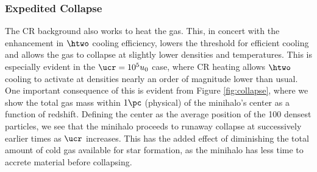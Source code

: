 \subsubsection{Expedited Collapse}
The CR background also works to heat the gas.  This, in concert with the enhancement in $\htwo$ cooling efficiency, lowers the threshold for efficient cooling and allows the gas to collapse at slightly lower densities and temperatures.  This is especially evident in the $\ucr = 10^5 u_0$ case, where CR heating allows $\htwo$ cooling to activate at densities nearly an order of magnitude lower than usual.  One important consequence of this is evident from Figure \ref{fig:collapse}, where we show the total gas mass within $1\pc$ (physical) of the minihalo's center as a function of redshift.  Defining the center as the average position of the 100 densest particles, we see that the minihalo proceeds to runaway collapse at successively earlier times as $\ucr$ increases.  This has the added effect of diminishing the total amount of cold gas available for star formation, as the minihalo has less time to accrete material before collapsing.